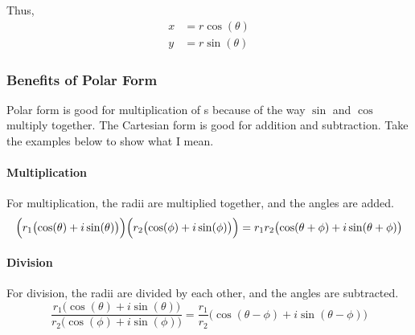 Thus,
\begin{equation}\label{eq:Convert_Cartesian_Polar}
  \begin{aligned}
    x &= r \cos(\theta) \\
    y &= r \sin(\theta)
  \end{aligned}
\end{equation}

\subsubsection{Benefits of Polar Form}\label{subsubsec:Polar_Form_Benefits}
Polar form is good for multiplication of s because of the way $\sin$ and $\cos$ multiply together.
The Cartesian form is good for addition and subtraction.
Take the examples below to show what I mean.

\paragraph{Multiplication}\label{par:Polar_Form_Multiplication}
For multiplication, the radii are multiplied together, and the angles are added.
\begin{equation}\label{eq:Polar_Form_Muliplication}
  \Bigl( r_{1} \bigl( \cos(\theta) + i \sin(\theta) \bigr) \Bigr) \Bigl( r_{2} \bigl( \cos(\phi) + i \sin(\phi) \bigr) \Bigr) = r_{1}r_{2} \bigl( \cos(\theta + \phi) + i \sin(\theta + \phi) \bigr)
\end{equation}

\paragraph{Division}\label{par:Polar_Form_Division}
For division, the radii are divided by each other, and the angles are subtracted.
\begin{equation}\label{eq:Polar_Form_Division}
  \frac{r_{1} \bigl( \cos(\theta) + i \sin(\theta) \bigr)}{r_{2} \bigl( \cos(\phi) + i \sin(\phi) \bigr)} = \frac{r_{1}}{r_{2}} \bigl( \cos(\theta - \phi) + i \sin(\theta - \phi) \bigr)
\end{equation}


